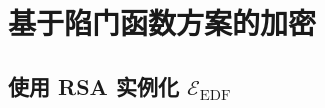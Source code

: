 \section{基于陷门函数方案的加密}\label{sec:11-4}

\subsection{使用 RSA 实例化 $\mathcal{E}_\mathrm{EDF}$}\label{subsec:11-4-1}